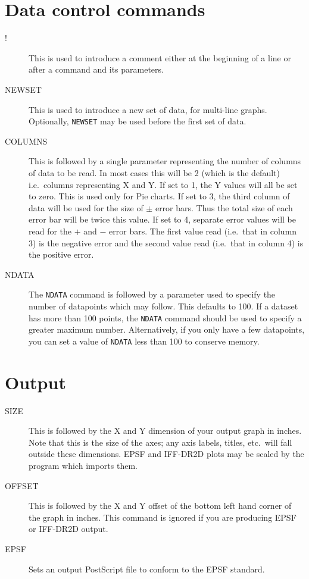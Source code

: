 \documentclass{report}
\begin{document}
\section{Data control commands}
\begin{description}
\item[!] This is used to introduce a comment either at the beginning of a 
line or after a command and its parameters.
\item[NEWSET] This is used to introduce a new set of data, for multi-line 
graphs. Optionally, {\tt NEWSET} may be used before the first set of data.
\item[COLUMNS] This is followed by a single parameter representing the 
number of columns of data to be read. In most cases this will be 2 (which is the 
default) i.e.\ columns representing X and Y. If set to 1, the Y values will all be 
set to zero. This is used only for Pie charts. If set to 3, the third column of data 
will be used for the size of $\pm$ error bars. Thus the total size of each error 
bar will be twice this value. If set to 4, separate error values will be read for
the $+$ and $-$ error bars. The first value read (i.e.\ that in column 3) is the
negative error and the second value read (i.e.\ that in column 4) is the positive
error.
\item[NDATA] The {\tt NDATA} command is followed by a parameter used to specify 
the number of datapoints which may 
follow. This defaults to 100. If a dataset has more than 100 points, the {\tt NDATA}
command should be used to specify a greater maximum number. Alternatively, if you 
only have a few datapoints, you can set a value of {\tt NDATA} less than 100 
to conserve memory.
\end{description}

\section{Output}
\begin{description}
\item[SIZE] This is followed by the X and Y dimension of your output graph
in inches. Note that this is the size of the axes; any axis  labels, titles, etc.\ 
will fall outside these dimensions. EPSF and IFF-DR2D plots may be scaled by the 
program which imports them.
\item[OFFSET] This is followed by the X and Y offset of the bottom left hand 
corner of the graph in inches. This command is ignored if you are producing EPSF or 
IFF-DR2D output.
\item[EPSF] Sets an output PostScript file to conform to the EPSF standard.
\end{description}
\end{document}
